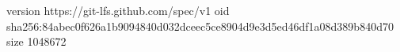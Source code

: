 version https://git-lfs.github.com/spec/v1
oid sha256:84abec0f626a1b9094840d032dceec5ce8904d9e3d5ed46df1a08d389b840d70
size 1048672
